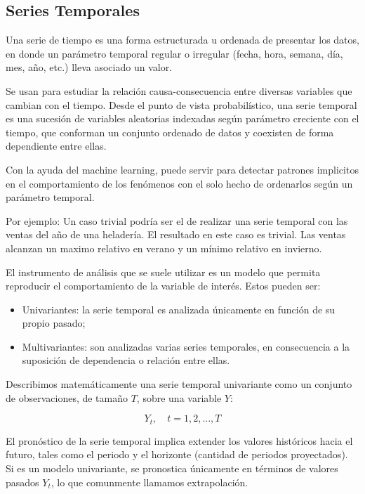 \documentclass[a4paper,10pt]{article}
\begin{document}
\bigskip

\bigskip

\subsection{Series Temporales}

Una serie de tiempo es una forma estructurada u ordenada de presentar los datos, en donde un parámetro temporal regular o irregular (fecha, hora, semana, día, mes, año, etc.) lleva asociado un valor.

Se usan para estudiar la relación causa-consecuencia entre diversas variables que cambian con el tiempo. Desde el punto de vista probabilístico, una serie temporal es una sucesión de variables aleatorias indexadas según parámetro creciente con el tiempo, que conforman un conjunto ordenado de datos y coexisten de forma dependiente entre ellas.

Con la ayuda del machine learning, puede servir para detectar patrones implicitos en el comportamiento de los fenómenos con el solo hecho de ordenarlos según un parámetro temporal.

Por ejemplo: Un caso trivial podría ser el de realizar una serie temporal con las ventas del año de una heladería. El resultado en este caso es trivial. Las ventas alcanzan un maximo relativo en verano y un mínimo relativo en invierno.

El instrumento de análisis que se suele utilizar es
un modelo que permita reproducir el comportamiento de la variable de interés. Estos pueden ser:

\begin{itemize}
 \item Univariantes: la serie temporal es analizada únicamente en función de su propio pasado;

 \item Multivariantes: son analizadas varias series temporales, en consecuencia a la suposición de dependencia o relación entre ellas.
\end{itemize}

Describimos matemáticamente una serie temporal univariante como un conjunto de observaciones, de tamaño $T$, sobre una variable $Y$:

\begin{equation}
 Y_t, \quad t = 1,2,...,T
\end{equation}



El pronóstico de la serie temporal implica extender los valores históricos hacia el futuro, tales como el periodo y el horizonte (cantidad de periodos proyectados). Si es un modelo univariante, se pronostica únicamente en términos de valores pasados $Y_t$, lo que comunmente llamamos extrapolación.
\end{document}
